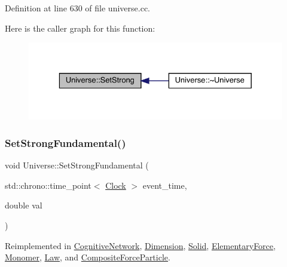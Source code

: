 Definition at line 630 of file universe.\+cc.

Here is the caller graph for this function\+:
\nopagebreak
\begin{figure}[H]
\begin{center}
\leavevmode
\includegraphics[width=329pt]{class_universe_a5946c8f3d4cda305f3ecd10df21a2f94_icgraph}
\end{center}
\end{figure}
\mbox{\label{class_universe_aafec97a231126b71c73ac1258609a284}} 
\subsubsection{\texorpdfstring{Set\+Strong\+Fundamental()}{SetStrongFundamental()}}
{\footnotesize\ttfamily void Universe\+::\+Set\+Strong\+Fundamental (\begin{DoxyParamCaption}\item[{std\+::chrono\+::time\+\_\+point$<$ \hyperlink{universe_8h_a0ef8d951d1ca5ab3cfaf7ab4c7a6fd80}{Clock} $>$}]{event\+\_\+time,  }\item[{double}]{val }\end{DoxyParamCaption})\hspace{0.3cm}{\ttfamily [virtual]}}



Reimplemented in \hyperlink{class_cognitive_network_ac54286eea279f5caa98b642b9084fd55}{Cognitive\+Network}, \hyperlink{class_dimension_a2de864aaa4b1074684395dbe928468c1}{Dimension}, \hyperlink{class_solid_a4342786a7785b1a3816d20de02105bcf}{Solid}, \hyperlink{class_elementary_force_afb00e9a10ec33eeb1daefce39b0468b7}{Elementary\+Force}, \hyperlink{class_monomer_ad9df06c1a8264bfdb514ef3ba04ef4c7}{Monomer}, \hyperlink{class_law_a4a7c8caa24acf453c1a8782a1ec4acf4}{Law}, and \hyperlink{class_composite_force_particle_a28d835658edcbecf60162475a8cb1ab6}{Composite\+Force\+Particle}.




